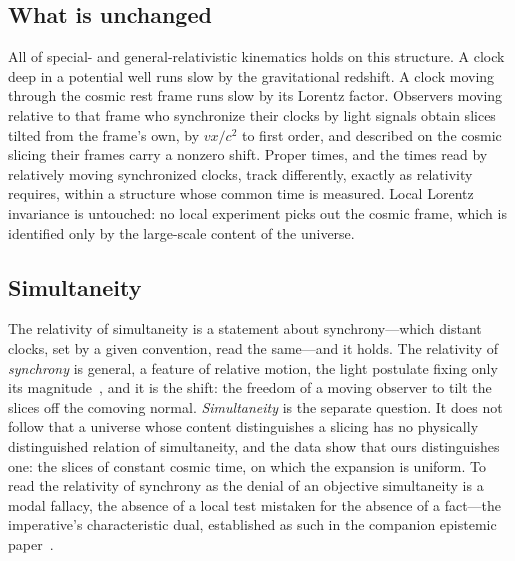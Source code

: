 \documentclass[11pt,a4paper]{article}
\begin{document}
\subsection{What is unchanged}\label{sec:unchanged}

All of special- and general-relativistic kinematics holds on this structure. A clock deep in a potential well runs slow by the gravitational redshift. A clock moving through the cosmic rest frame runs slow by its Lorentz factor. Observers moving relative to that frame who synchronize their clocks by light signals obtain slices tilted from the frame's own, by $vx/c^{2}$ to first order, and described on the cosmic slicing their frames carry a nonzero shift. Proper times, and the times read by relatively moving synchronized clocks, track differently, exactly as relativity requires, within a structure whose common time is measured. Local Lorentz invariance is untouched: no local experiment picks out the cosmic frame, which is identified only by the large-scale content of the universe.

\subsection{Simultaneity}\label{sec:simultaneity}

The relativity of simultaneity is a statement about synchrony---which distant clocks, set by a given convention, read the same---and it holds. The relativity of \emph{synchrony} is general, a feature of relative motion, the light postulate fixing only its magnitude~\cite{JanzenWildGoose, JanzenMisconstrue}, and it is the shift: the freedom of a moving observer to tilt the slices off the comoving normal. \emph{Simultaneity} is the separate question. It does not follow that a universe whose content distinguishes a slicing has no physically distinguished relation of simultaneity, and the data show that ours distinguishes one: the slices of constant cosmic time, on which the expansion is uniform. To read the relativity of synchrony as the denial of an objective simultaneity is a modal fallacy, the absence of a local test mistaken for the absence of a fact---the imperative's characteristic dual, established as such in the companion epistemic paper~\cite{JanzenShadowExistence, JanzenWildGoose}.
\end{document}
